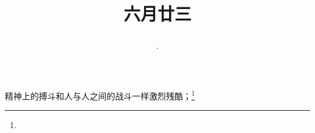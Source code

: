 \title{\date[d=28,m=7,y=2024][year:cn-y,年,month:cn,day:cn,日,·,weekday]·六月廿三 }
精神上的搏斗和人与人之间的战斗一样激烈残酷；\footnote{ }

